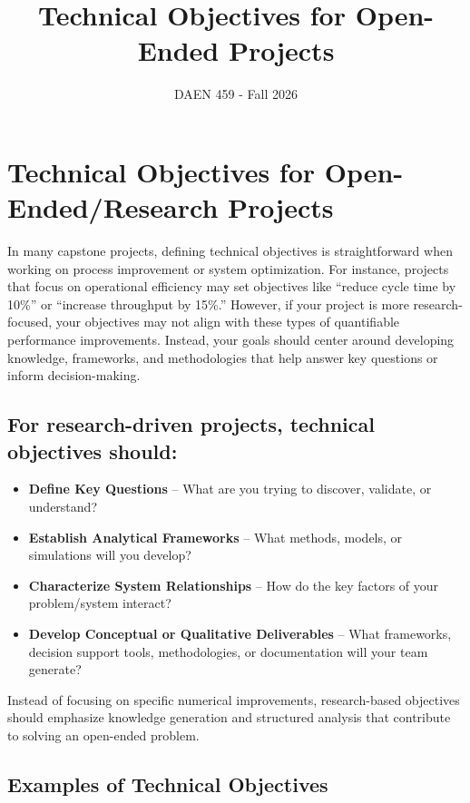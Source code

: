 \documentclass[12pt]{article}
\title{Technical Objectives for Open-Ended Projects}
\author{DAEN 459 - Fall 2026}
\date{}
\begin{document}
\maketitle

\section*{Technical Objectives for Open-Ended/Research Projects}

In many capstone projects, defining technical objectives is straightforward when working on process improvement or system optimization. For instance, projects that focus on operational efficiency may set objectives like ``reduce cycle time by 10\%'' or ``increase throughput by 15\%.'' However, if your project is more research-focused, your objectives may not align with these types of quantifiable performance improvements. Instead, your goals should center around developing knowledge, frameworks, and methodologies that help answer key questions or inform decision-making.

\subsection*{For research-driven projects, technical objectives should:}

\begin{itemize}[leftmargin=1.5cm]
    \item \textbf{Define Key Questions} – What are you trying to discover, validate, or understand?
    \item \textbf{Establish Analytical Frameworks} – What methods, models, or simulations will you develop?
    \item \textbf{Characterize System Relationships} – How do the key factors of your problem/system interact?
    \item \textbf{Develop Conceptual or Qualitative Deliverables} – What frameworks, decision support tools, methodologies, or documentation will your team generate?
\end{itemize}

Instead of focusing on specific numerical improvements, research-based objectives should emphasize knowledge generation and structured analysis that contribute to solving an open-ended problem.

\subsection*{Examples of Technical Objectives}
\end{document}
